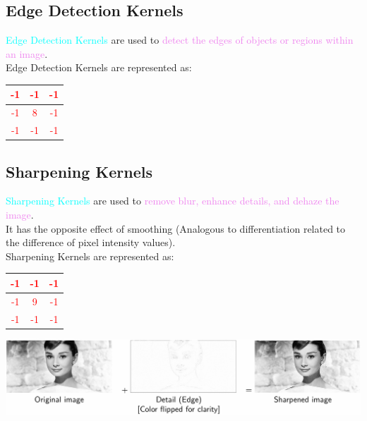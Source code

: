 \documentclass{book}
\begin{document}
\subsection{Edge Detection Kernels}
\textcolor{cyan}{Edge Detection Kernels} are used to \textcolor{violet}{detect the edges of objects or regions within an image}.\\
Edge Detection Kernels are represented as:
\begin{center}
    \textcolor{red}{
    \begin{tabular}{|c|c|c|}
        \hline
        -1 & -1 & -1 \\
        \hline
        -1 & 8 & -1 \\
        \hline
        -1 & -1 & -1 \\
        \hline
    \end{tabular}}
\end{center}
\subsection{Sharpening Kernels}
\textcolor{cyan}{Sharpening Kernels} are used to \textcolor{violet}{remove blur, enhance details, and dehaze the image}.\\
It has the opposite effect of smoothing (Analogous to differentiation related to the difference of pixel intensity values).\\
Sharpening Kernels are represented as:
\begin{center}
    \textcolor{red}{
    \begin{tabular}{|c|c|c|}
        \hline
        -1 & -1 & -1 \\
        \hline
        -1 & 9 & -1 \\
        \hline
        -1 & -1 & -1 \\
        \hline
    \end{tabular}}
\end{center}
\begin{center}
    \includegraphics[scale=0.3]{chapter 8/sharpening_kernel.jpeg}
\end{center}
\newpage
\end{document}

